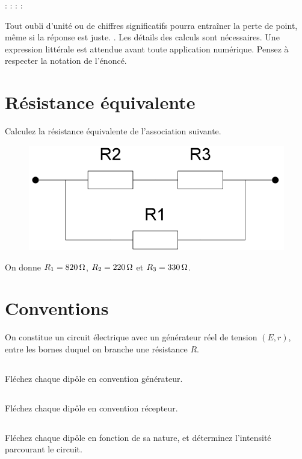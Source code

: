 \documentclass[10pt,a4paper]{article}
\begin{document}
\noindent {} : \hfill {} : \hfill {} : \hfill {} :
\hspace*{3em}\bigbreak

Tout oubli d’unité ou de chiffres significatifs pourra entraîner la perte de
point, même si la réponse est juste. . Les détails des calculs sont nécessaires. Une expression littérale
est attendue avant toute application numérique. Pensez à respecter la notation
de l'énoncé.

\section{Résistance équivalente}
Calculez la résistance équivalente de l'association suivante.
\begin{figure}[htbp!]
    \centering
    \includegraphics[width=.3\linewidth]{Req1.png}
    \captionsetup{justification=centering}
\end{figure}

On donne $R_1 = \SI{820}{\Omega}$, $R_2 = \SI{220}{\Omega}$ et $R_3 = \SI{330}{\Omega}$.

\vfill

\section{Conventions}
\noindent On constitue un circuit électrique avec un générateur réel de tension
$(E, r)$, entre les bornes duquel on branche une résistance $R$.

\subsection{}Fléchez chaque dipôle en convention générateur.
\vspace{3cm}
\subsection{}Fléchez chaque dipôle en convention récepteur.
\vspace{3cm}
\subsection{}Fléchez chaque dipôle en fonction de sa nature, et déterminez
l'intensité parcourant le circuit.
\vspace{3cm}
\end{document}
